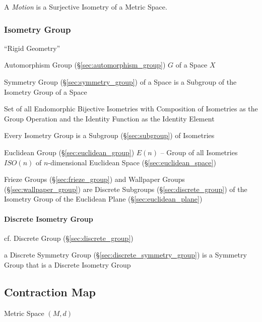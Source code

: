 
A \emph{Motion} is a Surjective Isometry of a Metric Space.



\subsubsection{Isometry Group}\label{sec:isometry_group}

``Rigid Geometry''

Automorphism Group (\S\ref{sec:automorphism_group}) $G$ of a Space $X$

Symmetry Group (\S\ref{sec:symmetry_group}) of a Space is a Subgroup
of the Isometry Group of a Space %

Set of all Endomorphic Bijective Isometries with Composition of
Isometries as the Group Operation and the Identity Function as the
Identity Element

Every Isometry Group is a Subgroup (\S\ref{sec:subgroup}) of Isometries

Euclidean Group (\S\ref{sec:euclidean_group}) $E(n)$ -- Group of all
Isometries $ISO(n)$ of $n$-dimensional Euclidean Space
(\S\ref{sec:euclidean_space})

Frieze Groups (\S\ref{sec:frieze_group}) and Wallpaper Groups
(\S\ref{sec:wallpaper_group}) are Discrete Subgroups
(\S\ref{sec:discrete_group}) of the Isometry Group of the Euclidean Plane
(\S\ref{sec:euclidean_plane})



\paragraph{Discrete Isometry Group}\label{sec:discrete_isometry_group}\hfill

cf. Discrete Group (\S\ref{sec:discrete_group})

a Discrete Symmetry Group (\S\ref{sec:discrete_symmetry_group}) is a Symmetry
Group that is a Discrete Isometry Group



\subsection{Contraction Map}\label{sec:contraction_map}

Metric Space $(M,d)$

